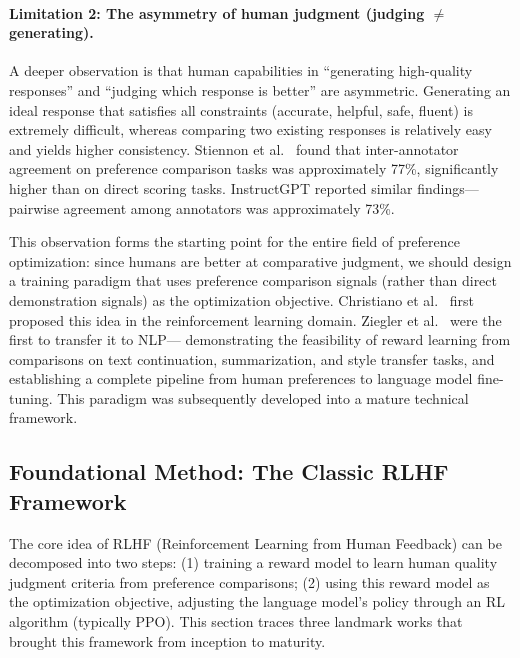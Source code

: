 \paragraph{Limitation 2: The asymmetry of human judgment (judging $\neq$ generating).}
A deeper observation is that
human capabilities in ``generating high-quality responses'' and ``judging which response is better'' are asymmetric.
Generating an ideal response that satisfies all constraints (accurate, helpful, safe, fluent) is extremely difficult,
whereas comparing two existing responses is relatively easy and yields higher consistency.
Stiennon et al.\ \cite{stiennon2020summarize} found that inter-annotator agreement
on preference comparison tasks was approximately 77\%, significantly higher than on direct scoring tasks.
InstructGPT \cite{ouyang2022instructgpt} reported similar findings---
pairwise agreement among annotators was approximately 73\%.


\noindent
This observation forms the starting point for the entire field of preference optimization:
since humans are better at comparative judgment, we should design a training paradigm
that uses preference comparison signals (rather than direct demonstration signals) as the optimization objective.
Christiano et al.\ \cite{christiano2017rlhf} first proposed this idea in the reinforcement learning domain.
Ziegler et al.\ \cite{ziegler2020finetuning} were the first to transfer it to NLP---
demonstrating the feasibility of reward learning from comparisons on text continuation, summarization, and style transfer tasks,
and establishing a complete pipeline from human preferences to language model fine-tuning.
This paradigm was subsequently developed into a mature technical framework.

\subsection{Foundational Method: The Classic RLHF Framework}
\label{sec:t2-foundation}

The core idea of RLHF (Reinforcement Learning from Human Feedback) can be decomposed into two steps:
(1) training a reward model to learn human quality judgment criteria from preference comparisons;
(2) using this reward model as the optimization objective, adjusting the language model's policy through an RL algorithm (typically PPO).
This section traces three landmark works that brought this framework from inception to maturity.

